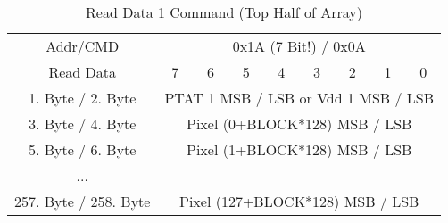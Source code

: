 \documentclass[thesis]{deutez}
\begin{document}
	\begin{table}[h!]
	\begin{center}
		\caption{Read Data 1 Command (Top Half of Array)}
		\begin{tabular}{|c|c|c|c|c|c|c|c|c|} 
			\hline
			Addr/CMD & \multicolumn{8}{c|}{0x1A (7 Bit!) / 0x0A}\\\cline{1-9}
			Read Data &7&6&5&4&3&2&1&0\\
			\cline{1-9}
			1. Byte / 2. Byte & \multicolumn{8}{c|}{PTAT 1 MSB / LSB or Vdd 1 MSB / LSB}\\\cline{1-9}
			3. Byte / 4. Byte & \multicolumn{8}{c|}{Pixel (0+BLOCK*128) MSB / LSB}\\\cline{1-9}
			5. Byte / 6. Byte & \multicolumn{8}{c|}{Pixel (1+BLOCK*128) MSB / LSB}\\\cline{1-9}
			... & \multicolumn{8}{c|}{}\\\cline{1-9}	
			257. Byte / 258. Byte & \multicolumn{8}{c|}{Pixel (127+BLOCK*128) MSB / LSB}\\\cline{1-9}
			
		\end{tabular}
	\end{center}
\end{table}
\FloatBarrier
\end{document}
